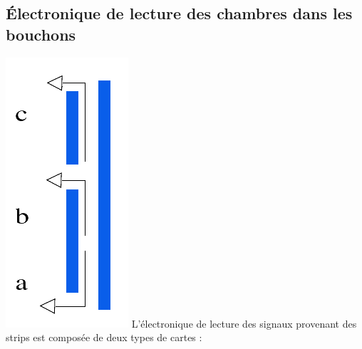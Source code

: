 \subsection{Électronique de lecture des chambres dans les bouchons}
\vspace{-0.2cm}
\marginpar
{
	\centering
	\includegraphics[width=\marginparwidth]{RPC/signalextraction.png}
	\label{extraction}
}
L'électronique de lecture des signaux provenant des strips est composée de deux types de cartes :
